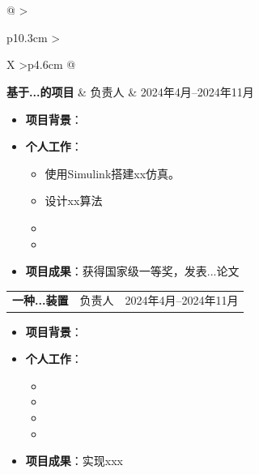 \documentclass[11pt]{article}
\newlength{\iconwidth}
\begin{document}
	\begin{minipage}[t]{\textwidth}
		\section[科研经历]{}
		
		\begin{tabularx}{\linewidth}{ 
				@{}
				>{\raggedright}p{10.3cm}
				>{\raggedright}X
				>{\raggedleft}p{4.6cm}
				@{}
			}
			\textbf{基于...的项目} & 负责人 & 2024年4月--2024年11月 \\
		\end{tabularx}
		
		\vspace{-0.5cm}
		\begin{itemize}
			\item \textbf{项目背景}：
			\item \textbf{个人工作}：
			\begin{itemize}
				\item 使用Simulink搭建xx仿真。
				\item 设计xx算法
				\item 
				\item
			\end{itemize}
			\item \textbf{项目成果}：获得国家级一等奖，发表...论文
		\end{itemize}
		
		\vspace{0.3cm}
		
		\begin{tabularx}{\linewidth}{ 
				@{}
				>{\raggedright}p{10.3cm}
				>{\raggedright}X
				>{\raggedleft}p{4.6cm}
				@{}
			}
			\textbf{一种...装置} & 负责人 & 2024年4月--2024年11月 \\
		\end{tabularx}
		
		\vspace{-0.5cm}
		\begin{itemize}
			\item \textbf{项目背景}：
			\item \textbf{个人工作}：
			\begin{itemize}
				\item
				\item 
				\item 
				\item
			\end{itemize}
			\item \textbf{项目成果}：实现xxx
		\end{itemize}
		
	\end{minipage}
\end{document}

